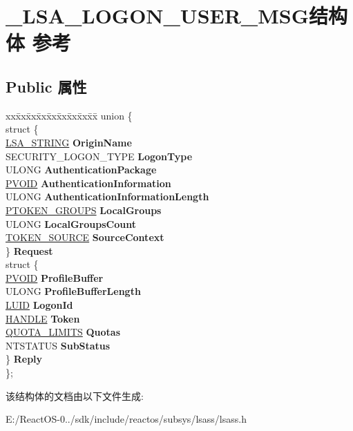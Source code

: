 \hypertarget{struct___l_s_a___l_o_g_o_n___u_s_e_r___m_s_g}{}\section{\+\_\+\+L\+S\+A\+\_\+\+L\+O\+G\+O\+N\+\_\+\+U\+S\+E\+R\+\_\+\+M\+S\+G结构体 参考}
\label{struct___l_s_a___l_o_g_o_n___u_s_e_r___m_s_g}
\subsection*{Public 属性}
\begin{DoxyCompactItemize}
\item 
\mbox{\label{struct___l_s_a___l_o_g_o_n___u_s_e_r___m_s_g_a96aee07bfd39cc6c5b343270365b4de0}} 
\begin{tabbing}
xx\=xx\=xx\=xx\=xx\=xx\=xx\=xx\=xx\=\kill
union \{\\
\>struct \{\\
\>\>\hyperlink{struct___l_s_a___s_t_r_i_n_g}{LSA\_STRING} {\bfseries OriginName}\\
\>\>SECURITY\_LOGON\_TYPE {\bfseries LogonType}\\
\>\>ULONG {\bfseries AuthenticationPackage}\\
\>\>\hyperlink{interfacevoid}{PVOID} {\bfseries AuthenticationInformation}\\
\>\>ULONG {\bfseries AuthenticationInformationLength}\\
\>\>\hyperlink{struct___t_o_k_e_n___g_r_o_u_p_s}{PTOKEN\_GROUPS} {\bfseries LocalGroups}\\
\>\>ULONG {\bfseries LocalGroupsCount}\\
\>\>\hyperlink{struct___t_o_k_e_n___s_o_u_r_c_e}{TOKEN\_SOURCE} {\bfseries SourceContext}\\
\>\} {\bfseries Request}\\
\>struct \{\\
\>\>\hyperlink{interfacevoid}{PVOID} {\bfseries ProfileBuffer}\\
\>\>ULONG {\bfseries ProfileBufferLength}\\
\>\>\hyperlink{struct___l_u_i_d}{LUID} {\bfseries LogonId}\\
\>\>\hyperlink{interfacevoid}{HANDLE} {\bfseries Token}\\
\>\>\hyperlink{struct___q_u_o_t_a___l_i_m_i_t_s}{QUOTA\_LIMITS} {\bfseries Quotas}\\
\>\>NTSTATUS {\bfseries SubStatus}\\
\>\} {\bfseries Reply}\\
\}; \\

\end{tabbing}\end{DoxyCompactItemize}


该结构体的文档由以下文件生成\+:\begin{DoxyCompactItemize}
\item 
E\+:/\+React\+O\+S-\/0../sdk/include/reactos/subsys/lsass/lsass.\+h\end{DoxyCompactItemize}

